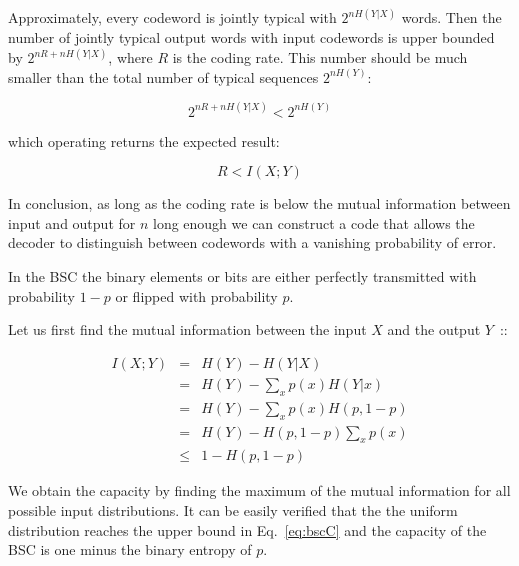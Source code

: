Approximately, every codeword is jointly typical with $2^{nH(Y|X)}$ words. Then the number of jointly typical output words with input codewords is upper bounded by $2^{nR+nH(Y|X)}$, where $R$ is the coding rate. This number should be much smaller than the total number of typical sequences $2^{nH(Y)}$:
 
\begin{equation*}
2^{nR+nH(Y|X)} < 2^{nH(Y)}
\end{equation*}

\noindent which operating returns the expected result:

\begin{equation*}
R < I(X;Y)
\end{equation*}

In conclusion, as long as the coding rate is below the mutual information between input and output for $n$ long enough we can construct a code that allows the decoder to distinguish between codewords with a vanishing probability of error.


In the {BSC} the binary elements or bits are either perfectly transmitted with probability $1-p$ or flipped with probability $p$. 

Let us first find the mutual information between the input $X$ and the output $Y$~\cite{Cover_91}::

\begin{eqnarray}
I(X;Y) &=& H(Y) - H(Y|X) \\
         &=& H(Y) - \sum_x p(x)H(Y|x) \\
         &=& H(Y) - \sum_x p(x)H(p,1-p) \\
         &=& H(Y) - H(p,1-p)\sum_x p(x) \\
         &\leq & 1 - H(p,1-p)\label{eq:bscC} 
\end{eqnarray}

We obtain the capacity by finding the maximum of the mutual information for all possible input distributions. It can be easily verified that the the uniform distribution reaches the upper bound in Eq.~\ref{eq:bscC} and the capacity of the {BSC} is one minus the binary entropy of $p$.

